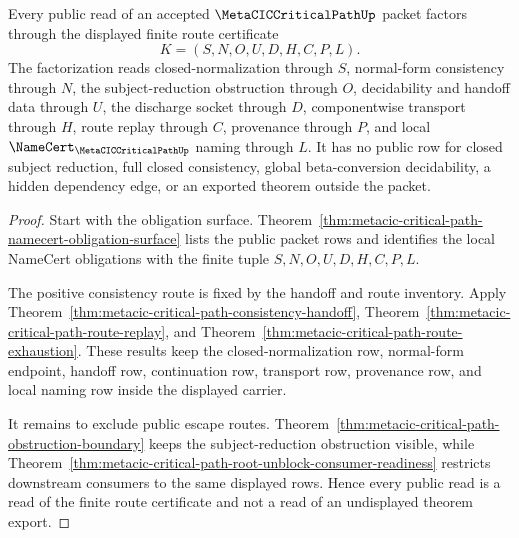 \begin{theorem}
\label{thm:metacic-critical-path-public-route-certificate}
Every public read of an accepted $\MetaCICCriticalPathUp$ packet factors through the displayed finite route certificate
$$
K=(S,N,O,U,D,H,C,P,L).
$$
The factorization reads closed-normalization through $S$, normal-form consistency through $N$, the subject-reduction obstruction through $O$, decidability and handoff data through $U$, the discharge socket through $D$, componentwise transport through $H$, route replay through $C$, provenance through $P$, and local $\NameCert_{\MetaCICCriticalPathUp}$ naming through $L$. It has no public row for closed subject reduction, full closed consistency, global beta-conversion decidability, a hidden dependency edge, or an exported theorem outside the packet.
\end{theorem}
\begin{proof}
Start with the obligation surface. Theorem~\ref{thm:metacic-critical-path-namecert-obligation-surface} lists the public packet rows and identifies the local NameCert obligations with the finite tuple $S,N,O,U,D,H,C,P,L$.

The positive consistency route is fixed by the handoff and route inventory. Apply Theorem~\ref{thm:metacic-critical-path-consistency-handoff}, Theorem~\ref{thm:metacic-critical-path-route-replay}, and Theorem~\ref{thm:metacic-critical-path-route-exhaustion}. These results keep the closed-normalization row, normal-form endpoint, handoff row, continuation row, transport row, provenance row, and local naming row inside the displayed carrier.

It remains to exclude public escape routes. Theorem~\ref{thm:metacic-critical-path-obstruction-boundary} keeps the subject-reduction obstruction visible, while Theorem~\ref{thm:metacic-critical-path-root-unblock-consumer-readiness} restricts downstream consumers to the same displayed rows. Hence every public read is a read of the finite route certificate and not a read of an undisplayed theorem export.
\end{proof}

